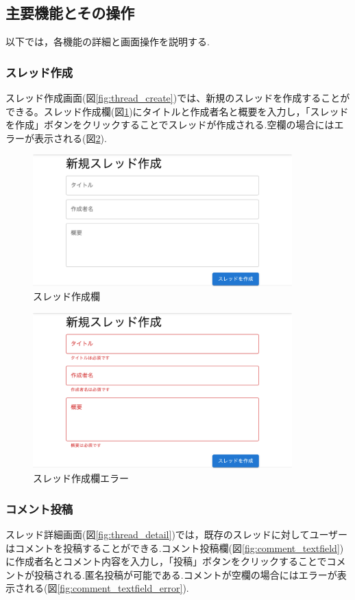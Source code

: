 \documentclass[b5paper,12pt,dvipdfmx]{jsreport}
\begin{document}
\subsection{主要機能とその操作}

以下では，各機能の詳細と画面操作を説明する.


\subsubsection{スレッド作成}
スレッド作成画面(図\ref{fig:thread_create})では、新規のスレッドを作成することができる。スレッド作成欄(図\ref{fig:thread_textfield})にタイトルと作成者名と概要を入力し，「スレッドを作成」ボタンをクリックすることでスレッドが作成される.空欄の場合にはエラーが表示される(図\ref{fig:thread_textfield_error}).

\begin{figure}[H]
	\centering
    \includegraphics[width=100mm,height=50.81mm]{./img/feature/thread_textfield.png}
	\caption{スレッド作成欄}
	\label{fig:thread_textfield}
\end{figure}

\begin{figure}[H]
	\centering
    \includegraphics[width=100mm,height=60.05mm]{./img/feature/thread_textfield_error.png}
	\caption{スレッド作成欄エラー}
	\label{fig:thread_textfield_error}
\end{figure}

\subsubsection{コメント投稿}
スレッド詳細画面(図\ref{fig:thread_detail})では，既存のスレッドに対してユーザーはコメントを投稿することができる.コメント投稿欄(図\ref{fig:comment_textfield})に作成者名とコメント内容を入力し，「投稿」ボタンをクリックすることでコメントが投稿される.匿名投稿が可能である.コメントが空欄の場合にはエラーが表示される(図\ref{fig:comment_textfield_error}).
\end{document}
